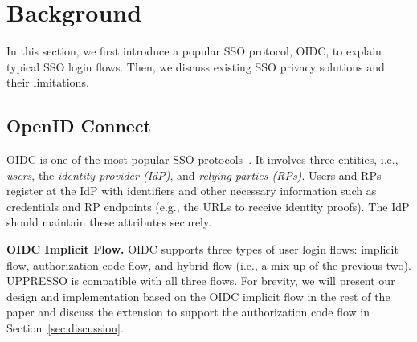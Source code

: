 \section{Background}
\label{sec:background}
In this section, we first introduce a popular SSO protocol, OIDC, to explain typical SSO login flows. Then, we discuss existing SSO privacy solutions and their limitations.

\subsection{OpenID Connect}
\label{subsec:OIDC}
OIDC is one of the most popular SSO protocols~\cite{OpenIDConnect}. %
It involves three entities, i.e., {\em users}, the {\em identity provider (IdP)}, and {\em relying parties (RPs)}.
Users and RPs register at the IdP with identifiers %
and other necessary information such as credentials and RP endpoints (e.g., the URLs to receive identity proofs).
The IdP should maintain these attributes securely.

\noindent\textbf{OIDC Implicit Flow.}
OIDC supports three types of user login flows: implicit flow, authorization code flow, and hybrid flow (i.e., a mix-up of the previous two).
UPPRESSO is compatible with all three flows. For brevity, we will present our design and implementation based on the OIDC implicit flow in the rest of the paper and discuss the extension to support the authorization code flow in Section~\ref{sec:discussion}.


